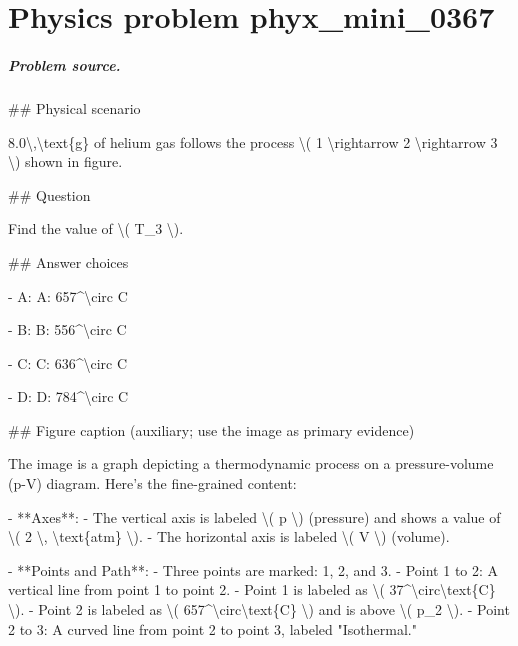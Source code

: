 
\chapter{Physics problem phyx\_mini\_0367}
\label{ch:PhyXMiniProblems_problem_phyx_mini_0367}

\paragraph{Problem source.}
\#\# Physical scenario

8.0\textbackslash{},\textbackslash{}text\{g\} of helium gas follows the process \textbackslash{}( 1 \textbackslash{}rightarrow 2 \textbackslash{}rightarrow 3 \textbackslash{}) shown in figure.

\#\# Question

Find the value of \textbackslash{}( T\_3 \textbackslash{}).

\#\# Answer choices

- A: A: 657\textasciicircum{}\textbackslash{}circ C

- B: B: 556\textasciicircum{}\textbackslash{}circ C

- C: C: 636\textasciicircum{}\textbackslash{}circ C

- D: D: 784\textasciicircum{}\textbackslash{}circ C

\#\# Figure caption (auxiliary; use the image as primary evidence)

The image is a graph depicting a thermodynamic process on a pressure-volume (p-V) diagram. Here's the fine-grained content:

- **Axes**: 
  - The vertical axis is labeled \textbackslash{}( p \textbackslash{}) (pressure) and shows a value of \textbackslash{}( 2 \textbackslash{}, \textbackslash{}text\{atm\} \textbackslash{}).
  - The horizontal axis is labeled \textbackslash{}( V \textbackslash{}) (volume).

- **Points and Path**:
  - Three points are marked: 1, 2, and 3.
  - Point 1 to 2: A vertical line from point 1 to point 2. 
    - Point 1 is labeled as \textbackslash{}( 37\textasciicircum{}\textbackslash{}circ\textbackslash{}text\{C\} \textbackslash{}).
    - Point 2 is labeled as \textbackslash{}( 657\textasciicircum{}\textbackslash{}circ\textbackslash{}text\{C\} \textbackslash{}) and is above \textbackslash{}( p\_2 \textbackslash{}).
  - Point 2 to 3: A curved line from point 2 to point 3, labeled "Isothermal."


